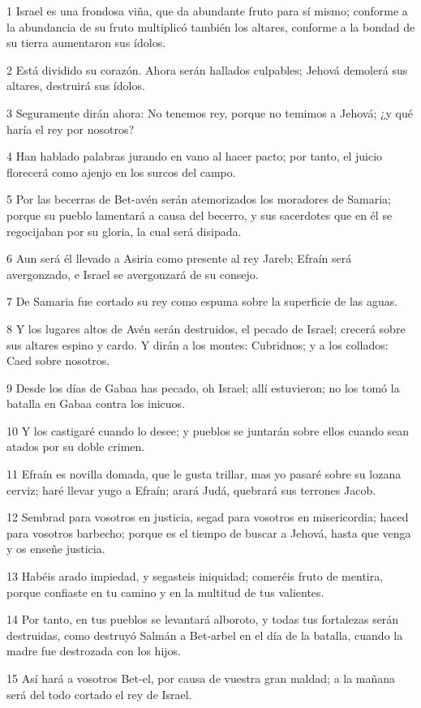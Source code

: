 \par 1 Israel es una frondosa viña, que da abundante fruto para sí mismo; conforme a la abundancia de su fruto multiplicó también los altares, conforme a la bondad de su tierra aumentaron sus ídolos.
\par 2 Está dividido su corazón. Ahora serán hallados culpables; Jehová demolerá sus altares, destruirá sus ídolos.
\par 3 Seguramente dirán ahora: No tenemos rey, porque no temimos a Jehová; ¿y qué haría el rey por nosotros?
\par 4 Han hablado palabras jurando en vano al hacer pacto; por tanto, el juicio florecerá como ajenjo en los surcos del campo.
\par 5 Por las becerras de Bet-avén serán atemorizados los moradores de Samaria; porque su pueblo lamentará a causa del becerro, y sus sacerdotes que en él se regocijaban por su gloria, la cual será disipada.
\par 6 Aun será él llevado a Asiria como presente al rey Jareb; Efraín será avergonzado, e Israel se avergonzará de su consejo.
\par 7 De Samaria fue cortado su rey como espuma sobre la superficie de las aguas.
\par 8 Y los lugares altos de Avén serán destruidos, el pecado de Israel; crecerá sobre sus altares espino y cardo. Y dirán a los montes: Cubridnos; y a los collados: Caed sobre nosotros. 
\par 9 Desde los días de Gabaa has pecado, oh Israel; allí estuvieron; no los tomó la batalla en Gabaa contra los inicuos.
\par 10 Y los castigaré cuando lo desee; y pueblos se juntarán sobre ellos cuando sean atados por su doble crimen.
\par 11 Efraín es novilla domada, que le gusta trillar, mas yo pasaré sobre su lozana cerviz; haré llevar yugo a Efraín; arará Judá, quebrará sus terrones Jacob.
\par 12 Sembrad para vosotros en justicia, segad para vosotros en misericordia; haced para vosotros barbecho; porque es el tiempo de buscar a Jehová, hasta que venga y os enseñe justicia.
\par 13 Habéis arado impiedad, y segasteis iniquidad; comeréis fruto de mentira, porque confiaste en tu camino y en la multitud de tus valientes.
\par 14 Por tanto, en tus pueblos se levantará alboroto, y todas tus fortalezas serán destruidas, como destruyó Salmán a Bet-arbel en el día de la batalla, cuando la madre fue destrozada con los hijos.
\par 15 Así hará a vosotros Bet-el, por causa de vuestra gran maldad; a la mañana será del todo cortado el rey de Israel.

